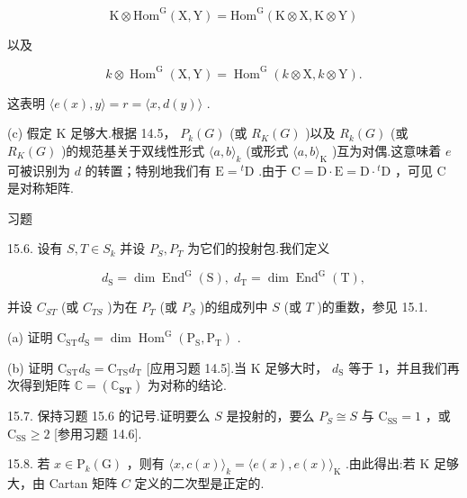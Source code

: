\documentclass[10pt]{article}
\begin{document}
\[
\mathrm{K} \otimes  {\mathrm{{Hom}}}^{\mathrm{G}}\left( {\mathrm{X},\mathrm{Y}}\right)  = {\mathrm{{Hom}}}^{\mathrm{G}}\left( {\mathrm{K} \otimes  \mathrm{X},\mathrm{K} \otimes  \mathrm{Y}}\right)
\]

以及

\[
k \otimes  {\operatorname{Hom}}^{\mathrm{G}}\left( {\mathrm{X},\mathrm{Y}}\right)  = {\operatorname{Hom}}^{\mathrm{G}}\left( {k \otimes  \mathrm{X},k \otimes  \mathrm{Y}}\right) .
\]

这表明 \(\langle e\left( x\right) ,y\rangle  = r = \langle x,d\left( y\right) \rangle\) .

(c) 假定 \(\mathrm{K}\) 足够大.根据 14.5， \({P}_{k}\left( G\right)\) (或 \({R}_{K}\left( G\right)\) )以及 \({R}_{k}\left( G\right)\) (或 \({R}_{K}\left( G\right)\) )的规范基关于双线性形式 \(\langle a,b{\rangle }_{k}\) (或形式 \(\langle a,b{\rangle }_{\mathrm{K}}\) )互为对偶.这意味着 \(e\) 可被识别为 \(d\) 的转置；特别地我们有 \(\mathrm{E} = {}^{t}\mathrm{D}\) .由于 \(\mathrm{C} = \mathrm{D} \cdot  \mathrm{E} = \mathrm{D} \cdot  {}^{t}\mathrm{D}\) ，可见 \(\mathrm{C}\) 是对称矩阵.

习题

15.6. 设有 \(S,T \in  {S}_{k}\) 并设 \({P}_{S},{P}_{T}\) 为它们的投射包.我们定义

\[
{d}_{\mathrm{S}} = \dim {\operatorname{End}}^{\mathrm{G}}\left( \mathrm{S}\right) ,\;{d}_{\mathrm{T}} = \dim {\operatorname{End}}^{\mathrm{G}}\left( \mathrm{T}\right) ,
\]

并设 \({C}_{ST}\) (或 \({C}_{TS}\) )为在 \({P}_{T}\) (或 \({P}_{S}\) )的组成列中 \(S\) (或 \(T\) )的重数，参见 15.1.

(a) 证明 \({\mathrm{C}}_{\mathrm{{ST}}}{d}_{\mathrm{S}} = \dim {\operatorname{Hom}}^{\mathrm{G}}\left( {{\mathrm{P}}_{\mathrm{S}},{\mathrm{P}}_{\mathrm{T}}}\right)\) .

(b) 证明 \({\mathrm{C}}_{\mathrm{{ST}}}{d}_{\mathrm{S}} = {\mathrm{C}}_{\mathrm{{TS}}}{d}_{\mathrm{T}}\) [应用习题 14.5].当 \(\mathrm{K}\) 足够大时， \({d}_{\mathrm{S}}\) 等于 1，并且我们再次得到矩阵 \(\mathbb{C} = \left( {\mathbb{C}}_{\mathbf{{ST}}}\right)\) 为对称的结论.

15.7. 保持习题 15.6 的记号.证明要么 \(S\) 是投射的，要么 \({P}_{S} \cong  S\) 与 \({\mathrm{C}}_{\mathrm{{SS}}} = 1\) ，或 \({\mathrm{C}}_{\mathrm{{SS}}} \geq  2\) [参用习题 14.6].

15.8. 若 \(x \in  {\mathrm{P}}_{k}\left( \mathrm{G}\right)\) ，则有 \(\langle x,c\left( x\right) {\rangle }_{k} = \langle e\left( x\right) ,e\left( x\right) {\rangle }_{\mathrm{K}}\) .由此得出:若 \(\mathrm{K}\) 足够大，由 Cartan 矩阵 \(C\) 定义的二次型是正定的.
\end{document}
